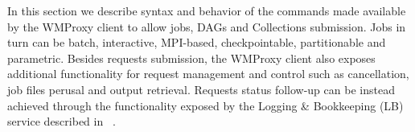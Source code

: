 
In this section we describe syntax and behavior of the commands made available by the WMProxy client
to allow jobs, DAGs and Collections submission. Jobs in turn can be batch, interactive, MPI-based, checkpointable,
partitionable and parametric.
Besides requests submission, the WMProxy client also exposes additional
functionality for request management and control such as cancellation, job files perusal and
output retrieval. Requests status follow-up can be instead achieved through
the functionality exposed by the Logging \& Bookkeeping (LB) service described in
~\cite{LB}.



\newpage


\newpage


\newpage


\newpage


\newpage


\newpage


\newpage


\newpage


